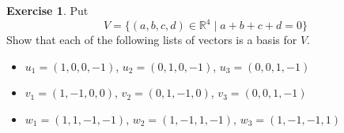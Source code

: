 \documentclass[a4paper]{amsart}
\newcommand{\R}         {{\mathbb{R}}}
\newcommand{\st}        {\;|\;}
\renewcommand{\:}{\colon}
\theoremstyle{definition}
\newtheorem{exercise}{Exercise}
\begin{document}




\begin{exercise}
 Put
 \[ V = \{(a,b,c,d)\in\R^4\st a+b+c+d=0\} \]
 Show that each of the following lists of vectors is a basis for
 $V$.
 \begin{itemize}
  \item $u_1=(1,0,0,-1)$, $u_2=(0,1,0,-1)$, $u_3=(0,0,1,-1)$
  \item $v_1=(1,-1,0,0)$, $v_2=(0,1,-1,0)$, $v_3=(0,0,1,-1)$
  \item $w_1=(1,1,-1,-1)$, $w_2=(1,-1,1,-1)$, $w_3=(1,-1,-1,1)$
 \end{itemize}
\end{exercise}
\end{document}
